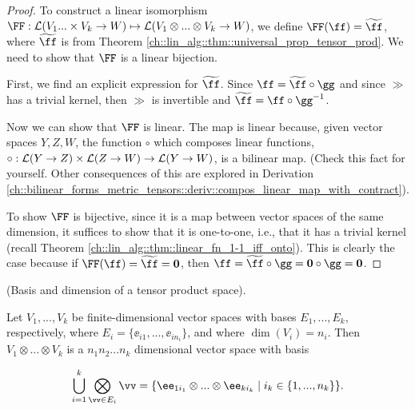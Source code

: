 \begin{proof}
    To construct a linear isomorphism $\FF:\LLLL(V_1 ... \times V_k \rightarrow W) \mapsto \LLLL(V_1 \otimes ... \otimes V_k \rightarrow W)$, we define $\FF(\ff) = \widetilde{\ff}$, where $\widetilde{\ff}$ is from Theorem \ref{ch::lin_alg::thm::universal_prop_tensor_prod}. We need to show that $\FF$ is a linear bijection. 
    
    First, we find an explicit expression for $\widetilde{\ff}$. Since $\ff = \widetilde{\ff} \circ \gg$ and since $\gg$ has a trivial kernel, then $\gg$ is invertible and $\widetilde{\ff} = \ff \circ \gg^{-1}$.

    Now we can show that $\FF$ is linear. The map is linear because, given vector spaces $Y, Z, W$, the function $\circ$ which composes linear functions, ${\circ:\mathcal{L}(Y \rightarrow Z) \times \mathcal{L}(Z \rightarrow W) \rightarrow \mathcal{L}(Y \rightarrow W)}$, is a bilinear map. (Check this fact for yourself. Other consequences of this are explored in Derivation \ref{ch::bilinear_forms_metric_tensors::deriv::compos_linear_map_with_contract}). 
    
    To show $\FF$ is bijective, since it is a map between vector spaces of the same dimension, it suffices to show that it is one-to-one, i.e., that it has a trivial kernel (recall Theorem \ref{ch::lin_alg::thm::linear_fn_1-1_iff_onto}). This is clearly the case because if $\FF(\ff) = \widetilde{\ff} = \mathbf{0}$, then $\ff = \widetilde{\ff} \circ \gg = \mathbf{0} \circ \gg = \mathbf{0}$.
\end{proof}

\begin{theorem}
\label{ch::motivated_intro::thm::basis_dim_tensor_product_space}
    (Basis and dimension of a tensor product space). 
    
    Let $V_1, ..., V_k$ be finite-dimensional vector spaces with bases $E_1, ..., E_k$, respectively, where $E_i = \{\ee_{i1}, ..., \ee_{in_i}\}$, and where $\dim(V_i) = n_i$. Then $V_1 \otimes ... \otimes V_k$ is a $n_1 n_2 ... n_k$ dimensional vector space with basis
    
    \begin{align*}
        \bigcup_{i = 1}^k \bigotimes_{\vv \in E_i} \vv = 
        \{ \ee_{1i_1} \otimes ... \otimes \ee_{ki_k} \mid i_k \in \{1, ..., n_k\} \}.
    \end{align*}
\end{theorem}

